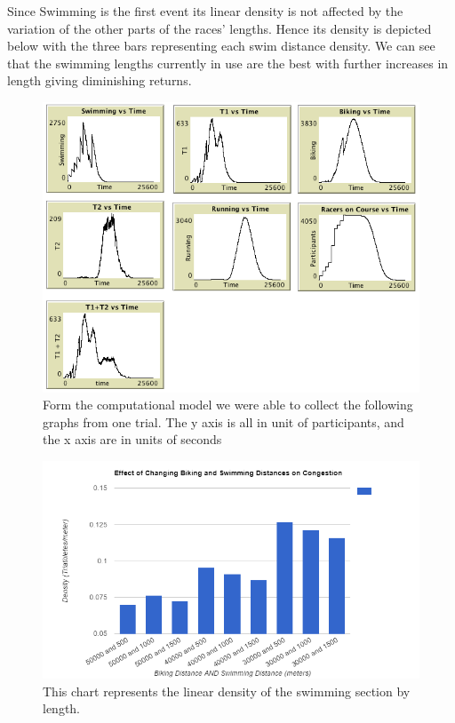 \documentclass[12pt]{article}
\begin{document}
Since Swimming is the first event its linear density is not affected by the variation of the other parts of the races' lengths. Hence its density is depicted below with the three bars representing each swim distance density. We can see that the swimming lengths currently in use are the best with further increases in length giving diminishing returns.

\begin{figure}[H]
    \label{fig:swimVariations}
  \centering
  \includegraphics[width=1\textwidth]{optimalGraphs.png}
  \caption{Form the computational model we were able to collect the following graphs from one trial. The y axis is all in unit of participants, and the x axis are in units of seconds}
\end{figure}

\begin{figure}[H]
    \label{fig:Biking}
  \centering
  \includegraphics[width=1\textwidth]{Biking}
  \caption{This chart represents the linear density of the swimming section by length.}
\end{figure}
\end{document}
